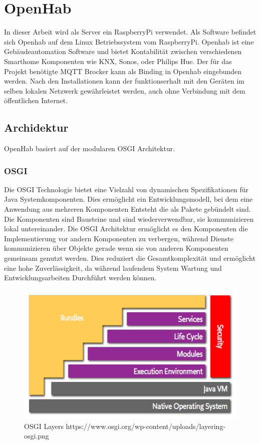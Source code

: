 \section{OpenHab}
In dieser Arbeit wird als Server ein RaspberryPi verwendet. Als Software befindet sich Openhab auf dem Linux Betriebssystem vom RaspberryPi. Openhab ist eine Gebäudeautomation Software und bietet Kontabilität zwischen verschiedenen Smarthome Komponenten wie KNX, Sonos, oder Philips Hue. Der für das Projekt benötigte MQTT Brocker kann als Binding in Openhab eingebunden werden. Nach den Installationen kann der funktionserhalt mit den Geräten im selben lokalen Netzwerk gewährleistet werden, auch ohne Verbindung mit dem öffentlichen Internet.
\subsection{Archidektur}
OpenHab basiert auf der modularen OSGI Architektur.
\subsubsection{OSGI}
Die OSGI Technologie bietet eine Vielzahl  von dynamischen Spezifikationen für Java Systemkomponenten. Dies ermöglicht ein Entwicklungsmodell, bei dem eine Anwendung aus  mehreren Komponenten Entsteht die als Pakete gebündelt sind. Die Komponenten sind Bausteine und sind wiederverwendbar, sie kommunizieren lokal untereinander. Die OSGI Architektur ermöglicht es den Komponenten die Implementierung vor andern Komponenten zu verbergen, während Dienste kommunizieren über Objekte gerade wenn sie von anderen Komponenten gemeinsam genutzt werden. Dies reduziert die Gesamtkomplexität und ermöglicht eine hohe Zuverlässigkeit, da während laufendem System Wartung und Entwicklungsarbeiten Durchführt werden können.  


 \begin{figure}[H]
	\centering
	\includegraphics[width=\textwidth]{graphics/OSGI.png}
	\caption{OSGI Layers https://www.osgi.org/wp-content/uploads/layering-osgi.png} 	
	\label{pic: OSGILayers}
\end{figure} 


